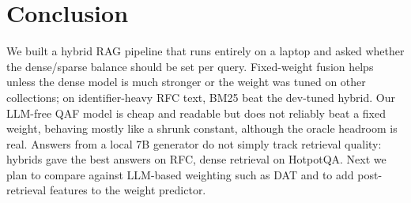 \section{Conclusion}
\label{sec:conclusion}
We built a hybrid RAG pipeline that runs entirely on a laptop and asked
whether the dense/sparse balance should be set per query. Fixed-weight fusion helps
unless the dense model is much stronger or the weight was tuned on other
collections; on identifier-heavy RFC text, BM25 beat the dev-tuned hybrid. Our LLM-free QAF model is cheap and readable but does not
reliably beat a fixed weight, behaving mostly like a shrunk constant, although
the oracle headroom is real. Answers from a local 7B generator do not simply
track retrieval quality: hybrids gave the best answers on RFC, dense retrieval
on HotpotQA. Next we plan to compare against LLM-based weighting such as DAT and to
add post-retrieval features to the weight predictor.
